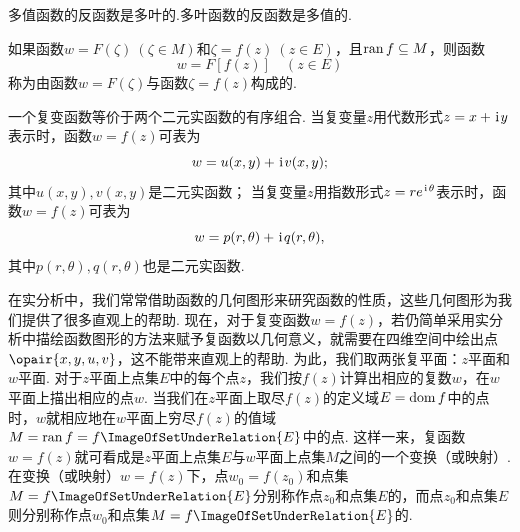 \begin{property}
多值函数的反函数是多叶的.多叶函数的反函数是多值的.
\end{property}

\begin{definition}
如果函数\(w = F(\zeta)\ (\zeta \in M)\)和\(\zeta = f(z)\ (z \in E)\)，且\(\operatorname{ran} f \subseteq M\)，则函数\begin{equation*}
w = F[f(z)] \quad (z \in E)
\end{equation*}称为由函数\(w = F(\zeta)\)与函数\(\zeta = f(z)\)构成的.
\end{definition}

一个复变函数等价于两个二元实函数的有序组合.
当复变量\(z\)用代数形式\(z = x + \kern1pt\mathrm{i}\kern1pt y\)表示时，函数\(w = f(z)\)可表为\begin{equation*}
w = u(x,y) + \kern1pt\mathrm{i}\kern1pt v(x,y);
\end{equation*}其中\(u(x,y), v(x,y)\)是二元实函数；
当复变量\(z\)用指数形式\(z = r e^{\kern1pt\mathrm{i}\kern1pt \theta}\)表示时，函数\(w = f(z)\)可表为\begin{equation*}
w = p(r,\theta) + \kern1pt\mathrm{i}\kern1pt q(r,\theta),
\end{equation*}其中\(p(r,\theta), q(r,\theta)\)也是二元实函数.

在实分析中，我们常常借助函数的几何图形来研究函数的性质，这些几何图形为我们提供了很多直观上的帮助.
现在，对于复变函数\(w = f(z)\)，若仍简单采用实分析中描绘函数图形的方法来赋予复函数以几何意义，就需要在四维空间中绘出点\(\opair{x,y,u,v}\)，这不能带来直观上的帮助.
为此，我们取两张复平面：\(z\)平面和\(w\)平面.
对于\(z\)平面上点集\(E\)中的每个点\(z\)，我们按\(f(z)\)计算出相应的复数\(w\)，在\(w\)平面上描出相应的点\(w\).
当我们在\(z\)平面上取尽\(f(z)\)的定义域\(E = \operatorname{dom} f\)中的点时，\(w\)就相应地在\(w\)平面上穷尽\(f(z)\)的值域\(M = \ran f = f\ImageOfSetUnderRelation{E}\)中的点.
这样一来，复函数\(w = f(z)\)就可看成是\(z\)平面上点集\(E\)与\(w\)平面上点集\(M\)之间的一个变换（或映射）.
在变换（或映射）\(w=f(z)\)下，点\(w_0=f(z_0)\)和点集\(M=f\ImageOfSetUnderRelation{E}\)分别称作点\(z_0\)和点集\(E\)的，而点\(z_0\)和点集\(E\)则分别称作点\(w_0\)和点集\(M=f\ImageOfSetUnderRelation{E}\)的.

